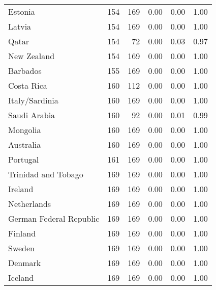 \begin{longtable}[t]{lrrrrr}
\addlinespace
Estonia & 154 & 169 & 0.00 & 0.00 & 1.00\\
Latvia & 154 & 169 & 0.00 & 0.00 & 1.00\\
Qatar & 154 & 72 & 0.00 & 0.03 & 0.97\\
New Zealand & 154 & 169 & 0.00 & 0.00 & 1.00\\
Barbados & 155 & 169 & 0.00 & 0.00 & 1.00\\
\addlinespace
Costa Rica & 160 & 112 & 0.00 & 0.00 & 1.00\\
Italy/Sardinia & 160 & 169 & 0.00 & 0.00 & 1.00\\
Saudi Arabia & 160 & 92 & 0.00 & 0.01 & 0.99\\
Mongolia & 160 & 169 & 0.00 & 0.00 & 1.00\\
Australia & 160 & 169 & 0.00 & 0.00 & 1.00\\
\addlinespace
Portugal & 161 & 169 & 0.00 & 0.00 & 1.00\\
Trinidad and Tobago & 169 & 169 & 0.00 & 0.00 & 1.00\\
Ireland & 169 & 169 & 0.00 & 0.00 & 1.00\\
Netherlands & 169 & 169 & 0.00 & 0.00 & 1.00\\
German Federal Republic & 169 & 169 & 0.00 & 0.00 & 1.00\\
\addlinespace
Finland & 169 & 169 & 0.00 & 0.00 & 1.00\\
Sweden & 169 & 169 & 0.00 & 0.00 & 1.00\\
Denmark & 169 & 169 & 0.00 & 0.00 & 1.00\\
Iceland & 169 & 169 & 0.00 & 0.00 & 1.00\\
\bottomrule
\end{longtable}
